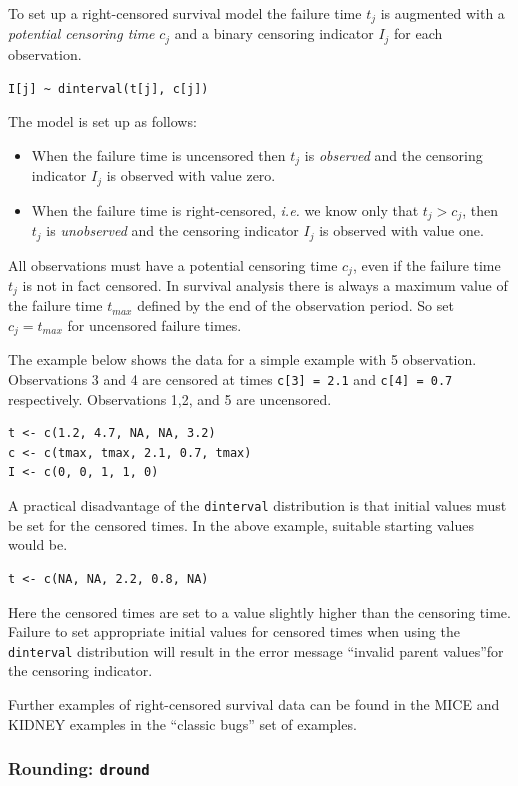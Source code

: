 \documentclass[11pt, a4paper, titlepage]{report}
\begin{document}
{To set up a right-censored survival model the failure time $t_j$ is
augmented with a {\em potential censoring time} $c_j$ and a binary
censoring indicator $I_j$ for each observation.
\begin{verbatim}
I[j] ~ dinterval(t[j], c[j])
\end{verbatim}
The model is set up as follows:
\begin{itemize}
\item When the failure time is uncensored then $t_j$ is {\em observed}
  and the censoring indicator $I_j$ is observed with value zero.
\item When the failure time is right-censored, {\em i.e.} we know only
  that $t_j > c_j$, then $t_j$ is {\em unobserved} and the censoring
  indicator $I_j$ is observed with value one.
\end{itemize}
All observations must have a potential censoring time $c_j$, even if
the failure time $t_j$ is not in fact censored.  In survival analysis
there is always a maximum value of the failure time $t_{max}$ defined
by the end of the observation period. So set $c_j = t_{max}$ for
uncensored failure times.

The example below shows the data for a simple example with 5 observation.
Observations 3 and 4 are censored at times \verb+c[3] = 2.1+ and
\verb+c[4] = 0.7+ respectively. Observations 1,2, and 5 are uncensored.
\begin{verbatim}
t <- c(1.2, 4.7, NA, NA, 3.2)
c <- c(tmax, tmax, 2.1, 0.7, tmax)
I <- c(0, 0, 1, 1, 0)
\end{verbatim}
A practical disadvantage of the \texttt{dinterval} distribution is that
initial values must be set for the censored times. In the above example,
suitable starting values would be. %
\begin{verbatim}
t <- c(NA, NA, 2.2, 0.8, NA)
\end{verbatim}
Here the censored times are set to a value slightly higher than the
censoring time. Failure to set appropriate initial values for censored
times when using the \texttt{dinterval} distribution will result in
the error message ``invalid parent values''for the censoring
indicator.

Further examples of right-censored survival data can be found in the
MICE and KIDNEY examples in the ``classic bugs'' set of examples.

\subsubsection{Rounding: \texttt{dround}}

}
\end{document}

